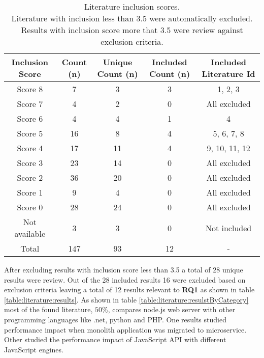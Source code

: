 \begin{table}[ht!]
    \begin{tabular}{|c c c c c|} 
        \hline
        Inclusion Score
        & Count (n)
        & Unique Count (n)
        & Included Count (n)
        & Included Literature Id
        \\ 
        \hline\hline
        Score 8
        & 7
        & 3
        & 3
        & 1, 2, 3
        \\ 
        
        Score 7
        & 4
        & 2
        & 0
        & All excluded
        \\ 
        
        Score 6
        & 4
        & 4
        & 1
        & 4
        \\ 
        
        Score 5
        & 16
        & 8
        & 4
        & 5, 6, 7, 8
        \\ 
        
        Score 4
        & 17
        & 11
        & 4
        & 9, 10, 11, 12
        \\ 
        
        Score 3
        & 23
        & 14
        & 0
        & All excluded
        \\ 
        
        Score 2
        & 36
        & 20
        & 0
        & All excluded
        \\ 
        
        Score 1
        & 9
        & 4
        & 0
        & All excluded
        \\ 
        
        Score 0
        & 28
        & 24
        & 0
        & All excluded
        \\ 
        
        Not available
        & 3
        & 3
        & 0
        & Not included
        \\ 
        \hline
        Total
        & 147
        & 93
        & 12
        & -
        \\ 
        \hline
    \end{tabular}    
    \caption{Literature inclusion scores.
    \\Literature with inclusion less than 3.5 were automatically excluded. Results with inclusion score more that 3.5 were review against exclusion criteria.}
    \label{table:literature:inclusionResults}
\end{table}
After excluding results with inclusion score less than 3.5 a total of 28 unique results were review.
Out of the 28 included results 16 were excluded based on exclusion criteria leaving a total of 12 results relevant to \textbf{RQ1} as shown in table \ref{table:literature:results}.
As shown in table \ref{table:literature:resulstByCategory} most of the found literature, $50\%$, compares node.js web server with other programming languages like .net, python and PHP.
One results studied performance impact when monolith application was migrated to microservice.
Other studied the performance impact of JavaScript API with different JavaScript engines.

